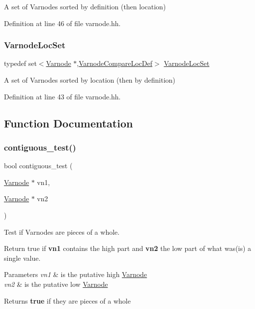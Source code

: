 A set of Varnodes sorted by definition (then location) 



Definition at line 46 of file varnode.\+hh.

\mbox{\label{varnode_8hh_a0c764dbc00f376e51070e39a84ff6bc8}} 
\subsubsection{\texorpdfstring{VarnodeLocSet}{VarnodeLocSet}}
{\footnotesize\ttfamily typedef set$<$\mbox{\hyperlink{class_varnode}{Varnode}} $\ast$,\mbox{\hyperlink{struct_varnode_compare_loc_def}{Varnode\+Compare\+Loc\+Def}}$>$ \mbox{\hyperlink{varnode_8hh_a0c764dbc00f376e51070e39a84ff6bc8}{Varnode\+Loc\+Set}}}



A set of Varnodes sorted by location (then by definition) 



Definition at line 43 of file varnode.\+hh.



\subsection{Function Documentation}
\mbox{\label{varnode_8hh_a4fd41aa3b524032766add2e4bdd5cd5c}} 
\subsubsection{\texorpdfstring{contiguous\_test()}{contiguous\_test()}}
{\footnotesize\ttfamily bool contiguous\+\_\+test (\begin{DoxyParamCaption}\item[{\mbox{\hyperlink{class_varnode}{Varnode}} $\ast$}]{vn1,  }\item[{\mbox{\hyperlink{class_varnode}{Varnode}} $\ast$}]{vn2 }\end{DoxyParamCaption})}



Test if Varnodes are pieces of a whole. 

Return true if {\bfseries{vn1}} contains the high part and {\bfseries{vn2}} the low part of what was(is) a single value. 
\begin{DoxyParams}{Parameters}
{\em vn1} & is the putative high \mbox{\hyperlink{class_varnode}{Varnode}} \\
\hline
{\em vn2} & is the putative low \mbox{\hyperlink{class_varnode}{Varnode}} \\
\hline
\end{DoxyParams}
\begin{DoxyReturn}{Returns}
{\bfseries{true}} if they are pieces of a whole 
\end{DoxyReturn}


